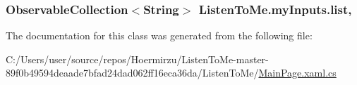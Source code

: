 \subsubsection[{\texorpdfstring{list}{list}}]{\setlength{\rightskip}{0pt plus 5cm}Observable\+Collection$<$String$>$ Listen\+To\+Me.\+my\+Inputs.\+list\hspace{0.3cm}{\ttfamily [get]}, {\ttfamily [set]}}\hypertarget{class_listen_to_me_1_1my_inputs_afa576673bde85df5836d17fb36f2d949}{}\label{class_listen_to_me_1_1my_inputs_afa576673bde85df5836d17fb36f2d949}


The documentation for this class was generated from the following file\+:\begin{DoxyCompactItemize}
\item 
C\+:/\+Users/user/source/repos/\+Hoermirzu/\+Listen\+To\+Me-\/master-\/89f0b49594deaade7bfad24dad062ff16eca36da/\+Listen\+To\+Me/\hyperlink{_main_page_8xaml_8cs}{Main\+Page.\+xaml.\+cs}\end{DoxyCompactItemize}
